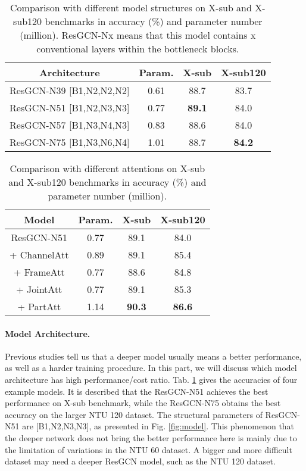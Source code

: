 \documentclass[sigconf]{acmart}
\begin{document}
\begin{table}
  \begin{center}
  \begin{tabular}{cc|cc}
  \hline
  Architecture & Param. & X-sub & X-sub120 \\
  \hline
  \hline
  ResGCN-N39 [B1,N2,N2,N2] & 0.61 & 88.7 & 83.7 \\
  ResGCN-N51 [B1,N2,N3,N3] & 0.77 & {\bf 89.1} & 84.0 \\
  ResGCN-N57 [B1,N3,N4,N3] & 0.83 & 88.6 & 84.0 \\
  ResGCN-N75 [B1,N3,N6,N4] & 1.01 & 88.7 & {\bf 84.2} \\
  \hline
  \end{tabular}
  \end{center}
  \caption{Comparison with different model structures on X-sub and X-sub120 benchmarks in accuracy (\%) and parameter number (million). ResGCN-Nx means that this model contains x conventional layers within the bottleneck blocks.}\label{tab:structure}
  \vspace{-0.4cm}
\end{table}

\begin{table}
  \begin{center}
  \begin{tabular}{cc|cc}
  \hline
  Model & Param. & X-sub & X-sub120 \\
  \hline
  \hline
  ResGCN-N51 & 0.77 & 89.1 & 84.0 \\
  \hline
  + ChannelAtt & 0.89 & 89.1 & 85.4 \\
  + FrameAtt & 0.77 & 88.6 & 84.8 \\
  + JointAtt & 0.77 & 89.1 & 85.3 \\
  + PartAtt & 1.14 & {\bf 90.3} & {\bf 86.6} \\
  \hline
  \end{tabular}
  \end{center}
  \caption{Comparison with different attentions on X-sub and X-sub120 benchmarks in accuracy (\%) and parameter number (million).}\label{tab:attention}
  \vspace{-0.4cm}
\end{table}

\paragraph{Model Architecture.} Previous studies \cite{he2016deep} tell us that a deeper model usually means a better performance, as well as a harder training procedure. In this part, we will discuss which model architecture has high performance/cost ratio. Tab. \ref{tab:structure} gives the accuracies of four example models. It is described that the ResGCN-N51 achieves the best performance on X-sub benchmark, while the ResGCN-N75 obtains the best accuracy on the larger NTU 120 dataset. The structural parameters of ResGCN-N51 are [B1,N2,N3,N3], as presented in Fig. \ref{fig:model}. This phenomenon that the deeper network does not bring the better performance here is mainly due to the limitation of variations in the NTU 60 dataset. A bigger and more difficult dataset may need a deeper ResGCN model, such as the NTU 120 dataset.
\end{document}
